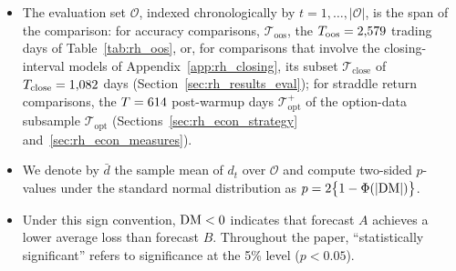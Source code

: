 \begin{itemize}
\begin{itemize}
  \item The evaluation set $\mathcal O$, indexed chronologically by $t = 1, \dots, |\mathcal O|$, is the span of the comparison: for accuracy comparisons, $\mathcal T_{\mathrm{oos}}$, the $T_{\mathrm{oos}} = 2{,}579$ trading days of Table~\ref{tab:rh_oos}, or, for comparisons that involve the closing-interval models of Appendix~\ref{app:rh_closing}, its subset $\mathcal T_{\mathrm{close}}$ of $T_{\mathrm{close}} = 1{,}082$ days (Section~\ref{sec:rh_results_eval}); for straddle return comparisons, the $T = 614$ post-warmup days $\mathcal T^{+}_{\mathrm{opt}}$ of the option-data subsample $\mathcal T_{\mathrm{opt}}$ (Sections~\ref{sec:rh_econ_strategy} and~\ref{sec:rh_econ_measures}).
  \item We denote by $\bar d$ the sample mean of $d_t$ over $\mathcal O$ and compute two-sided $p$-values under the standard normal distribution as $p = 2\bigl\{1 - \Phi(|\mathrm{DM}|)\bigr\}$.
  \item Under this sign convention, $\mathrm{DM} < 0$ indicates that forecast $A$ achieves a lower average loss than forecast $B$. Throughout the paper, ``statistically significant'' refers to significance at the 5\% level ($p < 0.05$).
  \end{itemize}

\end{itemize}
